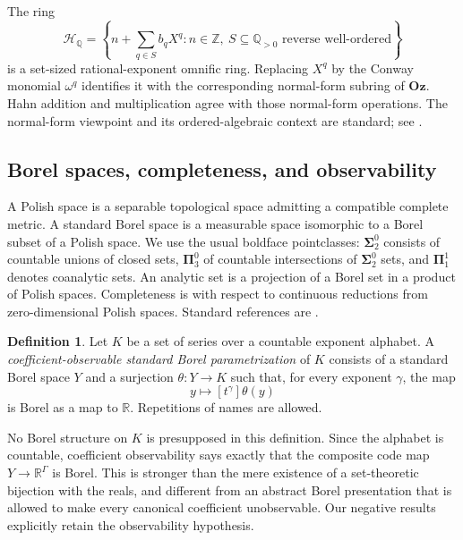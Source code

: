 \documentclass[11pt]{article}
\numberwithin{equation}{section}
\theoremstyle{definition}
\newtheorem{definition}[definition]{Definition}
\theoremstyle{remark}
\newcommand{\Z}{\mathbb Z}
\newcommand{\Q}{\mathbb Q}
\newcommand{\R}{\mathbb R}
\newcommand{\Oz}{\mathbf{Oz}}
\newcommand{\HQ}{\mathcal H_{\Q}}
\begin{document}
The ring
\begin{equation}
\label{pma:bor:eq:H}
 \HQ=\left\{n+\sum_{q\in S} b_qX^q:
 n\in\Z,\ S\subseteq\Q_{>0}\text{ reverse well-ordered}\right\}
\end{equation}
is a set-sized rational-exponent omnific ring. Replacing $X^q$ by the Conway
monomial $\omega^q$ identifies it with the corresponding normal-form subring
of $\Oz$. Hahn addition and multiplication agree with those normal-form
operations. The normal-form viewpoint and its ordered-algebraic context are
standard; see \cite{Neumann,EhrlichKaplan}.

\subsection{Borel spaces, completeness, and observability}

A Polish space is a separable topological space admitting a compatible
complete metric. A standard Borel space is a measurable space isomorphic to a
Borel subset of a Polish space. We use the usual boldface pointclasses:
$\boldsymbol\Sigma^0_2$ consists of countable unions of closed sets,
$\boldsymbol\Pi^0_3$ of countable intersections of
$\boldsymbol\Sigma^0_2$ sets, and $\boldsymbol\Pi^1_1$ denotes coanalytic sets.
An analytic set is a projection of a Borel set in a product of Polish spaces.
Completeness is with respect to continuous reductions from zero-dimensional
Polish spaces. Standard references are \cite{Kechris,Tserunyan}.

\begin{definition}
\label{pma:bor:def:observable}
Let $K$ be a set of series over a countable exponent alphabet. A
\emph{coefficient-observable standard Borel parametrization} of $K$ consists
of a standard Borel space $Y$ and a surjection $\theta:Y\to K$ such that, for
every exponent $\gamma$, the map
\[
 y\longmapsto [t^\gamma]\theta(y)
\]
is Borel as a map to $\R$. Repetitions of names are allowed.
\end{definition}

No Borel structure on $K$ is presupposed in this definition. Since the alphabet
is countable, coefficient observability says exactly that the composite code
map $Y\to\R^\Gamma$ is Borel. This is stronger than the mere existence of a
set-theoretic bijection with the reals, and different from an abstract Borel
presentation that is allowed to make every canonical coefficient unobservable.
Our negative results explicitly retain the observability hypothesis.
\end{document}
